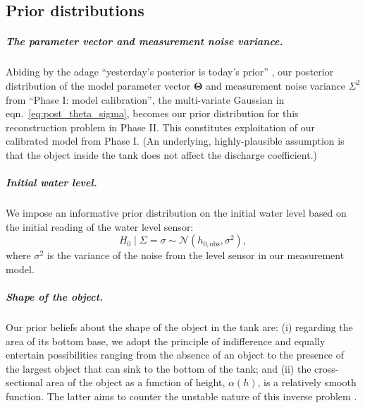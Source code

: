 \documentclass[openacc]{rsproca_new}%
\begin{document}
\subsection{Prior distributions}

\subparagraph{The parameter vector and measurement noise variance.}
Abiding by the adage ``yesterday's posterior is today's prior'' \cite{calvetti2010subjective}, 
our posterior distribution of the model parameter vector $\boldsymbol \Theta$ and measurement noise variance $\Sigma^2$ from ``Phase I: model calibration'', the multi-variate Gaussian in eqn.~\ref{eq:post_theta_sigma}, becomes our prior distribution for this reconstruction problem in Phase II.
This constitutes exploitation of our calibrated model from Phase I.
(An underlying, highly-plausible assumption is that the object inside the tank does not affect the discharge coefficient.)

\vspace{-\baselineskip}
\subparagraph{Initial water level.} We impose an informative prior distribution on the initial water level based on the initial reading of the water level sensor:
\begin{equation}
	H_0 \mid \Sigma = \sigma \sim \mathcal{N}(h_{0, \text{obs}}, \sigma^2),
\end{equation} where $\sigma^2$ is the variance of the noise from the level sensor in our measurement model.

\vspace{-\baselineskip}
\subparagraph{Shape of the object.}
Our prior beliefs about the shape of the object in the tank are:
(i) regarding the area of its bottom base, we adopt the principle of indifference and equally entertain possibilities ranging from the absence of an object to the presence of the largest object that can sink to the bottom of the tank;
and
(ii) the cross-sectional area of the object as a function of height, $\alpha(h)$, is a relatively smooth function.
The latter aims to counter the unstable nature of this inverse problem \cite{groetsch1993inverse}.
\end{document}
